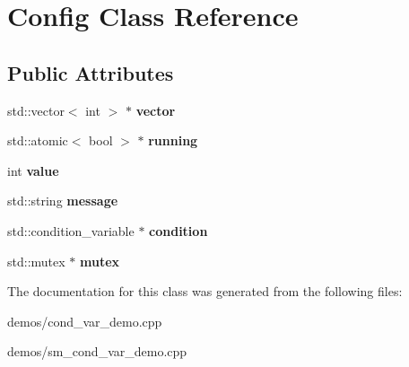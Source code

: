 \hypertarget{classConfig}{}\section{Config Class Reference}
\label{classConfig}
\subsection*{Public Attributes}
\begin{DoxyCompactItemize}
\item 
std\+::vector$<$ int $>$ $\ast$ {\bfseries vector}\hypertarget{classConfig_a090beefb5d61fbeb32fc116b32df30d7}{}\label{classConfig_a090beefb5d61fbeb32fc116b32df30d7}

\item 
std\+::atomic$<$ bool $>$ $\ast$ {\bfseries running}\hypertarget{classConfig_a32ce04a94d39445c2c35dc28e03006ef}{}\label{classConfig_a32ce04a94d39445c2c35dc28e03006ef}

\item 
int {\bfseries value}\hypertarget{classConfig_a0ed2027733c661de1fae2dbe70146ab4}{}\label{classConfig_a0ed2027733c661de1fae2dbe70146ab4}

\item 
std\+::string {\bfseries message}\hypertarget{classConfig_a05d75fea9600b821909ef25e947b3167}{}\label{classConfig_a05d75fea9600b821909ef25e947b3167}

\item 
std\+::condition\+\_\+variable $\ast$ {\bfseries condition}\hypertarget{classConfig_aa701cf3ea7f432c2879698446754d320}{}\label{classConfig_aa701cf3ea7f432c2879698446754d320}

\item 
std\+::mutex $\ast$ {\bfseries mutex}\hypertarget{classConfig_abacf2bdd32d425c995c2ba5b16a896bd}{}\label{classConfig_abacf2bdd32d425c995c2ba5b16a896bd}

\end{DoxyCompactItemize}


The documentation for this class was generated from the following files\+:\begin{DoxyCompactItemize}
\item 
demos/cond\+\_\+var\+\_\+demo.\+cpp\item 
demos/sm\+\_\+cond\+\_\+var\+\_\+demo.\+cpp\end{DoxyCompactItemize}

